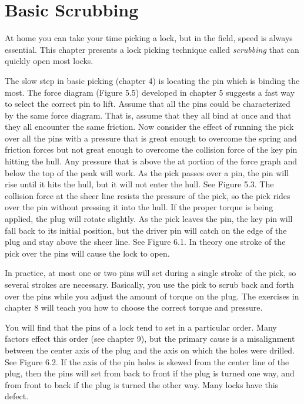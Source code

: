 \chapter{Basic Scrubbing}
At home you can take your time picking a lock, but in the field, speed is always essential.
This chapter presents a lock picking technique called \textit{scrubbing} that can quickly open most
locks.

The slow step in basic picking (chapter 4) is locating the pin which is binding the most.
The force diagram (Figure 5.5) developed in chapter 5 suggests a fast way to select the correct
pin to lift. Assume that all the pins could be characterized by the same force diagram. That
is, assume that they all bind at once and that they all encounter the same friction. Now
consider the effect of running the pick over all the pins with a pressure that is great enough
to overcome the spring and friction forces but not great enough to overcome the collision
force of the key pin hitting the hull. Any pressure that is above the at portion of the force graph
and below the top of the peak will work. As the pick passes over a pin, the pin will rise until it
hits the hull, but it will not enter the hull. See Figure 5.3. The collision force at the sheer line
resists the pressure of the pick, so the pick rides over the pin without pressing it into the hull.
If the proper torque is being applied, the plug will rotate slightly. As the pick leaves the pin,
the key pin will fall back to its initial position, but the driver pin will catch on the edge of
the plug and stay above the sheer line. See Figure 6.1. In theory one stroke of the pick over the
pins will cause the lock to open.

In practice, at most one or two pins will set during a single stroke of the pick, so several
strokes are necessary. Basically, you use the pick to scrub back and forth over the pins while
you adjust the amount of torque on the plug. The exercises in chapter 8 will teach you how
to choose the correct torque and pressure.

You will find that the pins of a lock tend to set in a particular order. Many factors effect
this order (see chapter 9), but the primary cause is a misalignment between the center axis
of the plug and the axis on which the holes were drilled. See Figure 6.2. If the axis of the
pin holes is skewed from the center line of the plug, then the pins will set from back to front
if the plug is turned one way, and from front to back if the plug is turned the other way.
Many locks have this defect.


